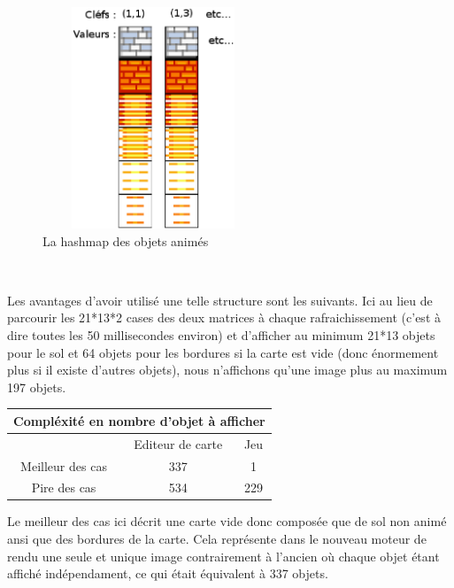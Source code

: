 {			\begin{figure}[!h]			
				\begin{center}						
					\includegraphics[width=250px, height=250px]{Developpement/Img/hashmap.eps}
					\caption{La hashmap des objets animés}
				\end{center}
			\end{figure}

			$\,$
			
			\newpage

			Les avantages d'avoir utilisé une telle structure sont les suivants. Ici au
			lieu de parcourir les 21*13*2 cases des deux matrices à chaque rafraichissement
			(c'est à dire toutes les 50 millisecondes environ) et d'afficher au minimum
			21*13 objets pour le sol et 64 objets pour les bordures si la carte est vide
			(donc énormement plus si il existe d'autres objets), nous n'affichons qu'une
			image plus au maximum 197 objets.
			
			\begin{center}
				\begin{tabular}{|c|c|c|} \hline
				\multicolumn{3}{c}{Compléxité en nombre d'objet à afficher} \\\hline
				  & Editeur de carte & Jeu    \\\hline 
				Meilleur des cas & 337 & 1    \\\hline
				Pire des cas     & 534 & 229  \\\hline		
				\end{tabular}
			\end{center}
			
			Le meilleur des cas ici décrit une carte vide donc composée que de sol non
			animé ansi que des bordures de la carte. Cela représente dans le nouveau
			moteur de rendu une seule et unique image contrairement à l'ancien où chaque
			objet étant affiché indépendament, ce qui était équivalent à 337 objets.
			
}
